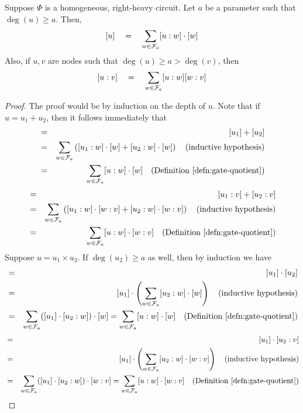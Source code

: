 \begin{lemma}
Suppose $\Phi$ is a homogeneous, right-heavy circuit. Let $a$ be a parameter such that $\deg(u) \geq a$. Then,
\begin{equation}\label{eqn:vsbr-for-u}
[u]\quad = \quad \sum_{w\in \mathcal{F}_a} [u:w] \cdot [w]
\end{equation}
Also, if $u,v$ are nodes such that $\deg(u) \geq a > \deg(v)$, then
\begin{equation}\label{eqn:vsbr-for-uv}
[u:v] \quad = \quad \sum_{w\in \mathcal{F}_a} [u:w] [w:v]
\end{equation}
\end{lemma}
\begin{proof}
The proof would be by induction on the depth of $u$. Note that if $u = u_1 + u_2$, then it follows immediately that 
\begin{eqnarray*}
  [u] &=& [u_1] + [u_2] \\
  &=& \sum_{w\in \mathcal{F}_a} \inparen{[u_1: w]\cdot [w]  + [u_2:w]\cdot [w]}\quad\text{(inductive hypothesis)}\\
  &=& \sum_{w\in \mathcal{F}_a} [u:w] \cdot [w] \quad\text{(Definition~\ref{defn:gate-quotient})}
\end{eqnarray*}
\begin{eqnarray*}
  [u:v] &=& [u_1:v] + [u_2:v] \\
  &=& \sum_{w\in \mathcal{F}_a} \inparen{[u_1: w]\cdot [w:v]  + [u_2:w]\cdot [w:v]}\quad\text{(inductive hypothesis)}\\
  &=& \sum_{w\in \mathcal{F}_a} [u:w] \cdot [w:v] \quad\text{(Definition~\ref{defn:gate-quotient})}
\end{eqnarray*}
Suppose $u = u_1 \times u_2$. If $\deg(u_2) \geq a$ as well, then by induction we have
\begin{eqnarray*}
[u] &=& [u_1] \cdot [u_2]\\
    &=& [u_1] \cdot \inparen{\sum_{w\in \mathcal{F}_a} [u_2:w]\cdot [w]} \quad\text{(inductive hypothesis)}\\
    &=& \sum_{w\in \mathcal{F}_a}([u_1]\cdot [u_2:w]) \cdot [w] = \sum_{w\in \mathcal{F}_a}[u:w] \cdot [w]\quad\text{(Definition~\ref{defn:gate-quotient})}
\end{eqnarray*}
\begin{eqnarray*}
[u:v] &=& [u_1] \cdot [u_2:v]\\
    &=& [u_1] \cdot \inparen{\sum_{w\in \mathcal{F}_a} [u_2:w]\cdot [w:v]} \quad\text{(inductive hypothesis)}\\
    &=& \sum_{w\in \mathcal{F}_a}([u_1]\cdot [u_2:w]) \cdot [w:v] = \sum_{w\in \mathcal{F}_a}[u:w] \cdot [w:v]\quad\text{(Definition~\ref{defn:gate-quotient})}
\end{eqnarray*}


\end{proof}
